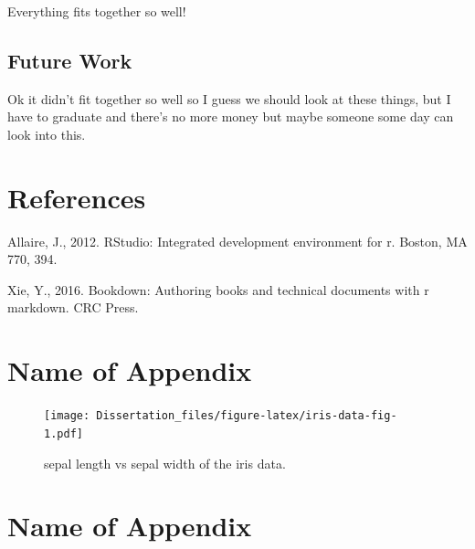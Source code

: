 \documentclass[
  10pt,
]{report}
\newlength{\cslhangindent}
\newlength{\cslentryspacingunit} %
\newenvironment{CSLReferences}[2] %
 {%
  \setlength{\parindent}{0pt}
  \ifodd #1
  \let\oldpar\par
  \def\par{\hangindent=\cslhangindent\oldpar}
  \fi
  \setlength{\parskip}{#2\cslentryspacingunit}
 }%
 {}
\begin{document}
Everything fits together so well!

\hypertarget{future-work}{%
\section{Future Work}\label{future-work}}

Ok it didn't fit together so well so I guess we should look at these things, but I have to graduate and there's no more money but maybe someone some day can look into this.

\hypertarget{references}{%
\chapter*{References}\label{references}}

\hypertarget{refs}{}
\begin{CSLReferences}{1}{0}
\leavevmode{}%
Allaire, J., 2012. RStudio: Integrated development environment for r. Boston, MA 770, 394.

\leavevmode{}%
Xie, Y., 2016. Bookdown: Authoring books and technical documents with r markdown. CRC Press.

\end{CSLReferences}

\hypertarget{appendix-appendix}{%
\appendix}


\hypertarget{name-of-appendix}{%
\chapter{Name of Appendix}\label{name-of-appendix}}

\begin{figure}
\centering
\texttt{[image: Dissertation\_files/figure-latex/iris-data-fig-1.pdf]}
\caption{\label{fig:iris-data-fig}sepal length vs sepal width of the iris data.}
\end{figure}

\hypertarget{name-of-appendix-1}{%
\chapter{Name of Appendix}\label{name-of-appendix-1}}
\end{document}
